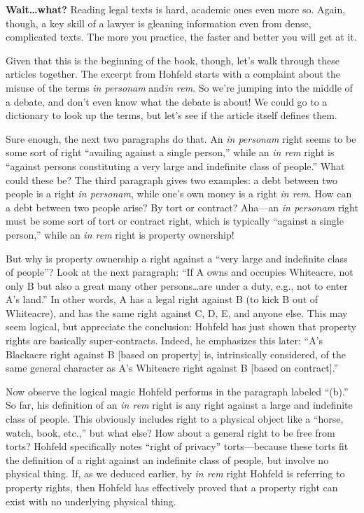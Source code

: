 \item \textbf{Wait\ldots what?} Reading legal texts is hard, academic ones even
more so. Again, though, a key skill of a lawyer is gleaning information even
from dense, complicated texts. The more you practice, the faster and better you
will get at it.

Given that this is the beginning of the book, though, let's walk through these
articles together. The excerpt from Hohfeld starts with a complaint about the
misuse of the terms \emph{in personam} and\emph{in rem}. So we're jumping into
the middle of a debate, and don't even know what the debate is about! We could
go to a dictionary to look up the terms, but let's see if the article itself
defines them.

Sure enough, the next two paragraphs do that. An \emph{in personam} right seems
to be some sort of right ``availing against a single person,'' while an \emph{in
rem} right is ``against persons constituting a very large and indefinite class
of people.'' What could these be? The third paragraph gives two examples: a debt
between two people is a right \emph{in personam}, while one's own money is a
right \emph{in rem}. How can a debt between two people arise? By tort or
contract? Aha---an \emph{in personam} right must be some sort of tort or
contract right, which is typically ``against a single person,'' while an
\emph{in rem} right is property ownership!

But why is property ownership a right against a ``very large and indefinite
class of people''? Look at the next paragraph: ``If A owns and occupies
Whiteacre, not only B but also a great many other persons\ldots are under a
duty, e.g., not to enter A's land.'' In other words, A has a legal right against
B (to kick B out of Whiteacre), and has the same right against C, D, E, and
anyone else. This may seem logical, but appreciate the conclusion: Hohfeld has
just shown that property rights are basically super-contracts. Indeed, he
emphasizes this later: ``A's Blackacre right against B [based on property] is,
intrinsically considered, of the same general character as A's Whiteacre right
against B [based on contract].''

Now observe the logical magic Hohfeld performs in the paragraph labeled ``(b).''
So far, his definition of an \emph{in rem} right is any right against a large
and indefinite class of people. This obviously includes right to a physical
object like a ``horse, watch, book, etc.,'' but what else? How about a general
right to be free from torts? Hohfeld specifically notes ``right of privacy''
torts---because these torts fit the definition of a right against an indefinite
class of people, but involve no physical thing. If, as we deduced earlier, by
\emph{in rem} right Hohfeld is referring to property rights, then Hohfeld has
effectively proved that a property right can exist with no underlying physical
thing.


